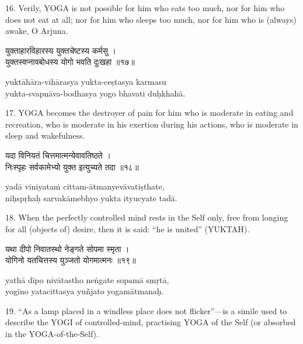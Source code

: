 16. Verily, YOGA is not possible for him who eats too much, nor for him who
does not eat at all; nor for him who sleeps too much, nor for him who is
(always) awake, O Arjuna.

\begin{gitaverse}
युक्ताहारविहारस्य युक्तचेष्टस्य कर्मसु । \\
युक्तस्वप्नावबोधस्य योगो भवति दुःखहा ॥१७॥
\end{gitaverse}

\begin{transliteration}
yuktāhāra-vihārasya yukta-ceṣtasya karmasu \\
yukta-svapnāva-bodhasya yogo bhavati duḥkhahā.
\end{transliteration}

17. YOGA becomes the destroyer of pain for him who is moderate in eating and
recreation, who is moderate in his exertion during his actions, who is moderate
in sleep and wakefulness.

\begin{gitaverse}
यदा विनियतं चित्तमात्मन्येवावतिष्ठते । \\
निःस्पृहः सर्वकामेभ्यो युक्त इत्युच्यते तदा ॥१८॥
\end{gitaverse}

\begin{transliteration}
yadā viniyataṁ cittam-ātmanyevāvatiṣthate, \\
niḥspṛhaḥ sarvakāmebhyo yukta ityucyate tadā.
\end{transliteration}

18. When the perfectly controlled mind rests in the Self only, free from
longing for all (objects of) desire, then it is said: ``he is united''
(YUKTAH).

\begin{gitaverse}
यथा दीपो निवातस्थो नेङ्गते सोपमा स्मृता । \\
योगिनो यतचित्तस्य युञ्जतो योगमात्मनः ॥१९॥
\end{gitaverse}

\begin{transliteration}
yathā dīpo nivātastho neṅgate sopamā smṛtā, \\
yogīno yatacittasya yuñjato yogamātmanaḥ.
\end{transliteration}

19. ``As a lamp placed in a windless place does not flicker''---is a simile
used to describe the YOGI of controlled-mind, practising YOGA of the Self (or
absorbed in the YOGA-of-the-Self).

